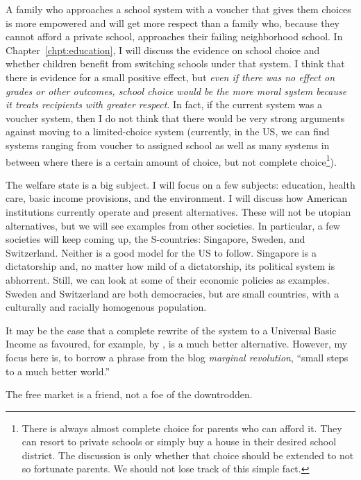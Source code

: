 A family who approaches a school system with a voucher that gives them choices
is more empowered and will get more respect than a family who, because they
cannot afford a private school, approaches their failing neighborhood school.
In Chapter~\ref{chpt:education}, I will discuss the evidence on school choice
and whether children benefit from switching schools under that system. I think
that there is evidence for a small positive effect, but \emph{even if there was
no effect on grades or other outcomes, school choice would be the more moral
system because it treats recipients with greater respect}. In fact, if the
current system was a voucher system, then I do not think that there would be
very strong arguments against moving to a limited-choice system (currently, in
the US, we can find systems ranging from voucher to assigned school as well as
many systems in between where there is a certain amount of choice, but not
complete choice\footnote{There is always almost complete choice for parents who
can afford it. They can resort to private schools or simply buy a house in
their desired school district. The discussion is only whether that choice
should be extended to not so fortunate parents. We should not lose track of
this simple fact.}).

The welfare state is a big subject. I will focus on a few subjects: education,
health care, basic income provisions, and the environment. I will discuss how
American institutions currently operate and present alternatives. These will
not be utopian alternatives, but we will see examples from other societies. In
particular, a few societies will keep coming up, the S-countries: Singapore,
Sweden, and Switzerland. Neither is a good model for the US to follow.
Singapore is a dictatorship and, no matter how mild of a dictatorship, its
political system is abhorrent. Still, we can look at some of their economic
policies as examples. Sweden and Switzerland are both democracies, but are
small countries, with a culturally and racially homogenous population.

It may be the case that a complete rewrite of the system to a Universal Basic
Income as favoured, for example, by \citet{MurrayUBI}, is a much better
alternative. However, my focus here is, to borrow a phrase from the blog
\emph{marginal revolution}, ``small steps to a much better world.''

The free market is a friend, not a foe of the downtrodden.


